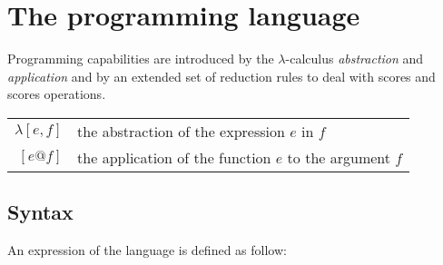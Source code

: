 \documentclass[10pt,a4paper,frenchb]{article}
\begin{document}
\section{The programming language}

Programming capabilities are introduced by the $\lambda$-calculus \emph{abstraction} and \emph{application} and by an extended set of reduction rules to deal with scores and scores operations.

\begin{center}
\begin{tabular}{rl}
\hline
$\lambda [e,f]$ & the abstraction of the expression $e$ in $f$ \\
$[e@f]$ & the application of the function $e$ to the argument $f$\\
\hline
\end{tabular}
\end{center}

\subsection{Syntax}

An expression of the language is defined as follow:
\end{document}
